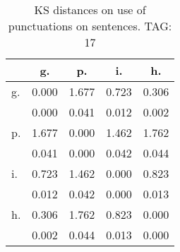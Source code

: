 \begin{table}[h!]
\begin{center}
\begin{tabular}{| l | c | c | c | c |}\hline
 & g. & p. & i. & h. \\\hline
g. & 0.000  & 1.677  & 0.723  & 0.306 \\\hline
 & 0.000  & 0.041  & 0.012  & 0.002 \\\hline
p. & 1.677  & 0.000  & 1.462  & 1.762 \\\hline
 & 0.041  & 0.000  & 0.042  & 0.044 \\\hline
i. & 0.723  & 1.462  & 0.000  & 0.823 \\\hline
 & 0.012  & 0.042  & 0.000  & 0.013 \\\hline
h. & 0.306  & 1.762  & 0.823  & 0.000 \\\hline
 & 0.002  & 0.044  & 0.013  & 0.000 \\\hline
\end{tabular}
\caption{KS distances on use of punctuations on sentences. TAG: 17}
\end{center}
\end{table}